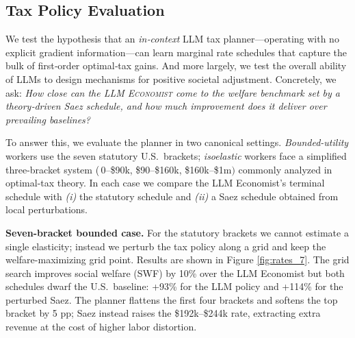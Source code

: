 \subsection{Tax Policy Evaluation}\label{subsec:taxopt}

We test the hypothesis that an \emph{in‑context} LLM tax planner—operating with no explicit gradient information—can learn marginal rate schedules that capture the bulk of first‑order optimal‑tax gains. And more largely, we test the overall ability of LLMs to design mechanisms for positive societal adjustment.  Concretely, we ask: \emph{How close can the \textsc{LLM Economist} come to the welfare benchmark set by a theory‑driven Saez schedule, and how much improvement does it deliver over prevailing baselines?} 

To answer this, we evaluate the planner in two canonical settings.  
\emph{Bounded-utility} workers use the seven statutory U.S.\ brackets;
\emph{isoelastic} workers face a simplified three-bracket system ($\,$0–\$90k, \$90–\$160k, \$160k–\$1m$)$ commonly analyzed in optimal-tax theory.  In each case we compare the LLM Economist’s terminal schedule with \textit{(i)} the statutory schedule and \textit{(ii)} a Saez schedule obtained from local perturbations.

\vspace{0.5em}
\noindent\textbf{Seven-bracket bounded case.}  
For the statutory brackets we cannot estimate a single elasticity; instead we perturb the tax policy along a grid and keep the welfare-maximizing grid point.  Results are
shown in Figure \ref{fig:rates_7}.  The grid search improves social welfare (SWF) by 10\% over the LLM Economist but both schedules dwarf the U.S.\ baseline: +93\% for the LLM policy and +114\% for the perturbed Saez.  The planner flattens the first four brackets and softens the top bracket by 5 pp; Saez instead raises the \$192k–\$244k rate, extracting extra revenue at the cost of higher labor distortion.


